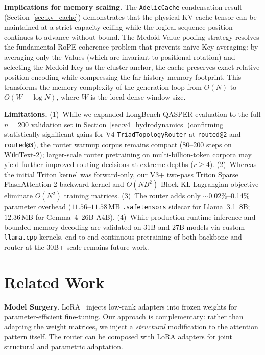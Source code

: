 \documentclass[11pt,a4paper]{article}
\begin{document}
\textbf{Implications for memory scaling.} The \texttt{AdelicCache} condensation result (Section~\ref{sec:kv_cache}) demonstrates that the physical KV cache tensor can be maintained at a strict capacity ceiling while the logical sequence position continues to advance without bound. The Medoid-Value pooling strategy resolves the fundamental RoPE coherence problem that prevents naive Key averaging: by averaging only the Values (which are invariant to positional rotation) and selecting the Medoid Key as the cluster anchor, the cache preserves exact relative position encoding while compressing the far-history memory footprint. This transforms the memory complexity of the generation loop from $O(N)$ to $O(W + \log N)$, where $W$ is the local dense window size.

\textbf{Limitations.} (1)~While we expanded LongBench QASPER evaluation to the full $n=200$ validation set in Section~\ref{sec:v4_hydrodynamics} (confirming statistically significant gains for V4 \texttt{TriadTopologyRouter} at \texttt{routed@2} and \texttt{routed@3}), the router warmup corpus remains compact (80--200 steps on WikiText-2); larger-scale router pretraining on multi-billion-token corpora may yield further improved routing decisions at extreme depths ($r \ge 4$). (2)~Whereas the initial Triton kernel was forward-only, our V3+ two-pass Triton Sparse FlashAttention-2 backward kernel and $O(N B^2)$ Block-KL-Lagrangian objective eliminate $O(N^2)$ training matrices. (3)~The router adds only $\sim$0.02\%--0.14\% parameter overhead ($11.56$--$11.58$\,MB \texttt{.safetensors} sidecar for Llama~3.1~8B; $12.36$\,MB for Gemma~4~26B-A4B). (4)~While production runtime inference and bounded-memory decoding are validated on 31B and 27B models via custom \texttt{llama.cpp} kernels, end-to-end continuous pretraining of both backbone and router at the 30B+ scale remains future work.

\section{Related Work}

\textbf{Model Surgery.} LoRA~\citep{hu2022lora} injects low-rank adapters into frozen weights for parameter-efficient fine-tuning. Our approach is complementary: rather than adapting the weight matrices, we inject a \emph{structural} modification to the attention pattern itself. The router can be composed with LoRA adapters for joint structural and parametric adaptation.
\end{document}
